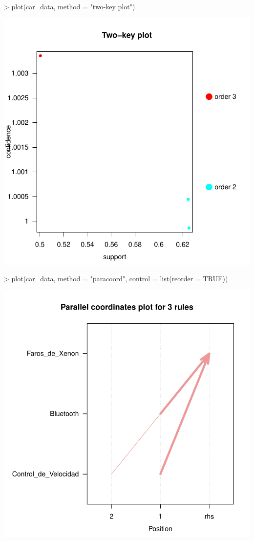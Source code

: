 \documentclass [a4paper] {article}
\begin{document}
\begin{center}
\begin{Schunk}
\begin{Sinput}
> plot(car_data, method = "two-key plot")
\end{Sinput}
\end{Schunk}
\includegraphics{entrega-grafica_apriori_car_two_key}
\begin{Schunk}
\begin{Sinput}
> plot(car_data, method = "paracoord", control = list(reorder = TRUE))
\end{Sinput}
\end{Schunk}
\includegraphics{entrega-grafica_apriori_car_paracoord}

\end{center}
\end{document}
